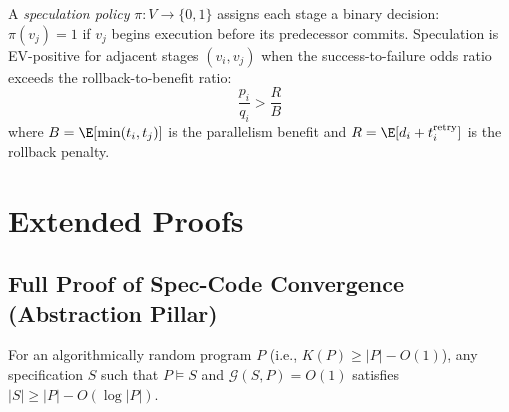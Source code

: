 \begin{definition}
\label{def:ext-speculation}
A \emph{speculation policy} $\pi: V \to \{0,1\}$ assigns each stage a binary
decision: $\pi(v_j) = 1$ if $v_j$ begins execution before its predecessor commits.
Speculation is EV-positive for adjacent stages $(v_i, v_j)$ when the success-to-failure
odds ratio exceeds the rollback-to-benefit ratio:
\[
  \frac{p_i}{q_i} > \frac{R}{B}
\]
where $B = \E[\min(t_i, t_j)]$ is the parallelism benefit and
$R = \E[d_i + t_i^{\mathrm{retry}}]$ is the rollback penalty.
\end{definition}



\section{Extended Proofs}
\label{app:proofs-extended}

\subsection{Full Proof of Spec-Code Convergence (Abstraction Pillar)}

\begin{theorem}
For an algorithmically random program $P$ (i.e., $K(P) \geq |P| - O(1)$),
any specification $S$ such that $P \models S$ and
$\mathcal{G}(S, P) = O(1)$ satisfies $|S| \geq |P| - O(\log |P|)$.
\end{theorem}

